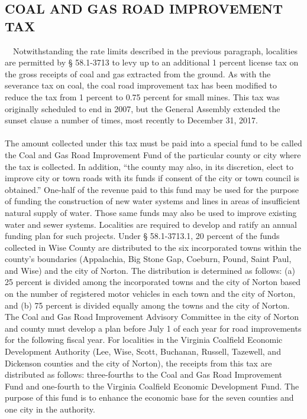 \documentclass[
]{book}
\begin{document}
\hypertarget{coal-and-gas-road-improvement-tax}{%
\subsection{COAL AND GAS ROAD IMPROVEMENT TAX}\label{coal-and-gas-road-improvement-tax}}

~~Notwithstanding the rate limits described in the previous paragraph, localities are permitted by § 58.1-3713 to levy up to an additional 1 percent license tax on the gross receipts of coal and gas extracted from the ground. As with the severance tax on coal, the coal road improvement tax has been modified to reduce the tax from 1 percent to 0.75 percent for small mines. This tax was originally scheduled to end in 2007, but the General Assembly extended the sunset clause a number of times, most recently to December 31, 2017.\\
~\\
\hspace*{0.333em}\hspace*{0.333em}The amount collected under this tax must be paid into a special fund to be called the Coal and Gas Road Improvement Fund of the particular county or city where the tax is collected. In addition, ``the county may also, in its discretion, elect to improve city or town roads with its funds if consent of the city or town council is obtained.'' One-half of the revenue paid to this fund may be used for the purpose of funding the construction of new water systems and lines in areas of insufficient natural supply of water. Those same funds may also be used to improve existing water and sewer systems. Localities are required to develop and ratify an annual funding plan for such projects. Under § 58.1-3713.1, 20 percent of the funds collected in Wise County are distributed to the six incorporated towns within the county's boundaries (Appalachia, Big Stone Gap, Coeburn, Pound, Saint Paul, and Wise) and the city of Norton. The distribution is determined as follows: (a) 25 percent is divided among the incorporated towns and the city of Norton based on the number of registered motor vehicles in each town and the city of Norton, and (b) 75 percent is divided equally among the towns and the city of Norton. The Coal and Gas Road Improvement Advisory Committee in the city of Norton and county must develop a plan before July 1 of each year for road improvements for the following fiscal year. For localities in the Virginia Coalfield Economic Development Authority (Lee, Wise, Scott, Buchanan, Russell, Tazewell, and Dickenson counties and the city of Norton), the receipts from this tax are distributed as follows: three-fourths to the Coal and Gas Road Improvement Fund and one-fourth to the Virginia Coalfield Economic Development Fund. The purpose of this fund is to enhance the economic base for the seven counties and one city in the authority.
\end{document}
